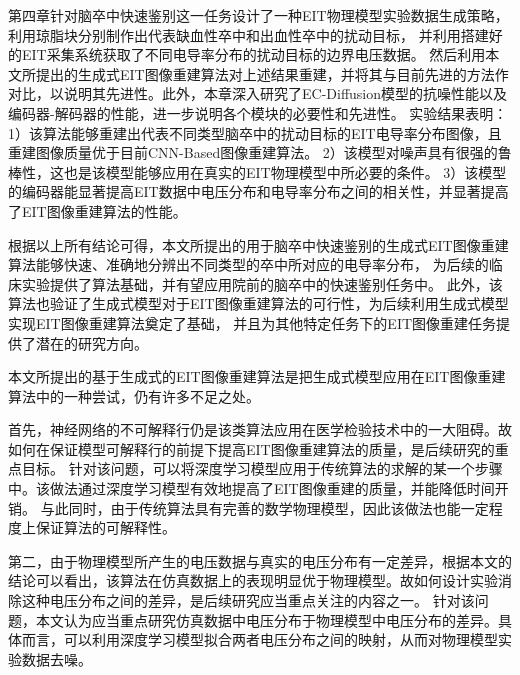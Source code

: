 第四章针对脑卒中快速鉴别这一任务设计了一种EIT物理模型实验数据生成策略，利用琼脂块分别制作出代表缺血性卒中和出血性卒中的扰动目标，
并利用搭建好的EIT采集系统获取了不同电导率分布的扰动目标的边界电压数据。
然后利用本文所提出的生成式EIT图像重建算法对上述结果重建，并将其与目前先进的方法作对比，以说明其先进性。此外，本章深入研究了EC-Diffusion模型的抗噪性能以及编码器-解码器的性能，进一步说明各个模块的必要性和先进性。
实验结果表明：
1）该算法能够重建出代表不同类型脑卒中的扰动目标的EIT电导率分布图像，且重建图像质量优于目前CNN-Based图像重建算法。
2）该模型对噪声具有很强的鲁棒性，这也是该模型能够应用在真实的EIT物理模型中所必要的条件。
3）该模型的编码器能显著提高EIT数据中电压分布和电导率分布之间的相关性，并显著提高了EIT图像重建算法的性能。


根据以上所有结论可得，本文所提出的用于脑卒中快速鉴别的生成式EIT图像重建算法能够快速、准确地分辨出不同类型的卒中所对应的电导率分布，
为后续的临床实验提供了算法基础，并有望应用院前的脑卒中的快速鉴别任务中。
此外，该算法也验证了生成式模型对于EIT图像重建算法的可行性，为后续利用生成式模型实现EIT图像重建算法奠定了基础，
并且为其他特定任务下的EIT图像重建任务提供了潜在的研究方向。
 
 
本文所提出的基于生成式的EIT图像重建算法是把生成式模型应用在EIT图像重建算法中的一种尝试，仍有许多不足之处。
 
首先，神经网络的不可解释行仍是该类算法应用在医学检验技术中的一大阻碍。故如何在保证模型可解释行的前提下提高EIT图像重建算法的质量，是后续研究的重点目标。
针对该问题，可以将深度学习模型应用于传统算法的求解的某一个步骤中。该做法通过深度学习模型有效地提高了EIT图像重建的质量，并能降低时间开销。
与此同时，由于传统算法具有完善的数学物理模型，因此该做法也能一定程度上保证算法的可解释性。
 
第二，由于物理模型所产生的电压数据与真实的电压分布有一定差异，根据本文的结论可以看出，该算法在仿真数据上的表现明显优于物理模型。故如何设计实验消除这种电压分布之间的差异，是后续研究应当重点关注的内容之一。
针对该问题，本文认为应当重点研究仿真数据中电压分布于物理模型中电压分布的差异。具体而言，可以利用深度学习模型拟合两者电压分布之间的映射，从而对物理模型实验数据去噪。